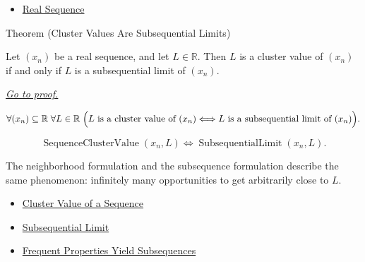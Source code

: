 \begin{dependencies}
\begin{itemize}
  \item \hyperref[def:real-sequence]{Real Sequence}
\end{itemize}
\end{dependencies}


\begin{theorembox}{Theorem (Cluster Values Are Subsequential Limits)}
\begin{theorem}
\label{thm:cluster-values-are-subsequential-limits}
Let $(x_n)$ be a real sequence, and let $L\in\mathbb{R}$. Then $L$ is a
cluster value of $(x_n)$ if and only if $L$ is a subsequential limit of
$(x_n)$.

\smallskip
\noindent
\hyperref[prf:cluster-values-are-subsequential-limits]{\textit{Go to proof.}}
\end{theorem}
\end{theorembox}

\begin{remark*}
\[
\forall (x_n)\subseteq\mathbb{R}\;\forall L\in\mathbb{R}\;
\Bigl(
L\text{ is a cluster value of }(x_n)
\Longleftrightarrow
L\text{ is a subsequential limit of }(x_n)
\Bigr).
\]
\end{remark*}

\begin{remark*}
\[
\operatorname{SequenceClusterValue}(x_n,L)
\Longleftrightarrow
\operatorname{SubsequentialLimit}(x_n,L).
\]
\end{remark*}

\begin{remark*}[Interpretation]
The neighborhood formulation and the subsequence formulation describe the
same phenomenon: infinitely many opportunities to get arbitrarily close to
$L$.
\end{remark*}

\begin{dependencies}
\begin{itemize}
  \item \hyperref[def:cluster-value-sequence]{Cluster Value of a Sequence}
  \item \hyperref[def:subsequential-limit]{Subsequential Limit}
  \item \hyperref[thm:frequent-properties-yield-subsequences]{Frequent Properties Yield Subsequences}
\end{itemize}
\end{dependencies}

